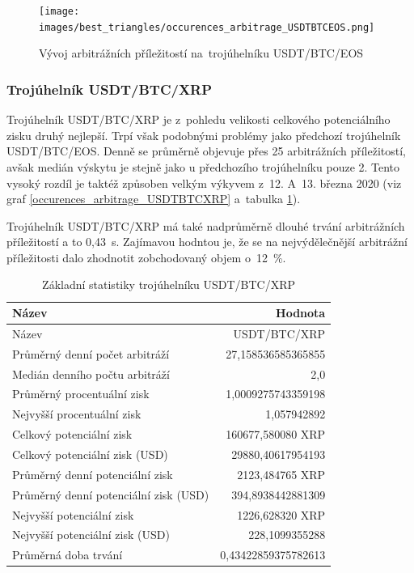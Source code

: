 \documentclass[thesis=B,czech]{FITthesis}[2019/03/21]
\begin{document}
\begin{figure}\centering
	\texttt{[image: images/best\_triangles/occurences\_arbitrage\_USDTBTCEOS.png]}
	\caption{Vývoj arbitrážních příležitostí na~trojúhelníku USDT/BTC/EOS }\label{occurences_arbitrage_USDTBTCEOS}
\end{figure}

\subsubsection{Trojúhelník USDT/BTC/XRP}
Trojúhelník USDT/BTC/XRP je z~pohledu velikosti celkového potenciálního zisku druhý nejlepší. Trpí však podobnými problémy jako předchozí trojúhelník USDT/BTC/EOS. Denně se průměrně objevuje přes 25 arbitrážních \linebreak příležitostí, avšak medián výskytu je stejně jako u předchozího trojúhelníku pouze 2. Tento vysoký rozdíl je taktéž způsoben velkým výkyvem z~12. A~13. března 2020 (viz graf \ref{occurences_arbitrage_USDTBTCXRP} a~tabulka \ref{USDTBTCXRP_stats}).

Trojúhelník USDT/BTC/XRP má také nadprůměrně dlouhé trvání arbitrážních příležitostí a to 0,43~s. Zajímavou hodntou je, že se na \linebreak nejvýdělečnější arbitrážní příležitosti dalo zhodnotit zobchodovaný \linebreak objem o~12~\%. 

\begin{table}\centering
\caption{Základní statistiky trojúhelníku USDT/BTC/XRP}
\label{USDTBTCXRP_stats}
\begin{tabular}{|| l | r ||}
\hline Název & Hodnota \\ 
\hline\hline Název & USDT/BTC/XRP \\ 
\hline Průměrný denní počet arbitráží & 27,158536585365855 \\ 
\hline Medián denního počtu arbitráží & 2,0 \\ 
\hline Průměrný procentuální zisk & 1,0009275743359198 \\ 
\hline Nejvyšší procentuální zisk & 1,057942892 \\ 
\hline Celkový potenciální zisk & 160677,580080 XRP \\ 
\hline Celkový potenciální zisk (USD) & 29880,40617954193 \\ 
\hline Průměrný denní potenciální zisk & 2123,484765 XRP \\ 
\hline Průměrný denní potenciální zisk (USD) & 394,8938442881309 \\ 
\hline Nejvyšší potenciální zisk & 1226,628320 XRP \\ 
\hline Nejvyšší potenciální zisk (USD) & 228,1099355288 \\ 
\hline Průměrná doba trvání & 0,43422859375782613 \\ 
\hline
\end{tabular}
\end{table}
\end{document}
